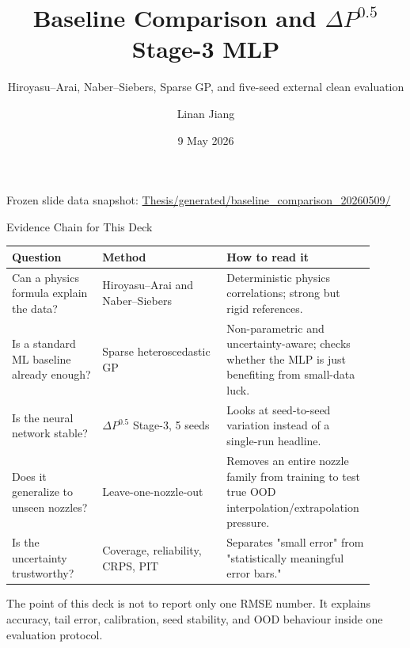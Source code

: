 \documentclass[aspectratio=169,11pt]{beamer}
\title[Baseline Comparison]{Baseline Comparison and \texorpdfstring{\(\Delta P^{0.5}\)}{Delta P exponent 0.5} Stage-3 MLP}
\subtitle{Hiroyasu--Arai, Naber--Siebers, Sparse GP, and five-seed external clean evaluation}
\author{Linan Jiang}
\institute{Aalto University}
\date{9 May 2026}
\begin{document}
\begin{frame}
  \titlepage
  \vspace{-0.8em}
  \centering
  \tiny Frozen slide data snapshot:
  \url{Thesis/generated/baseline_comparison_20260509/}
\end{frame}

\begin{frame}{Evidence Chain for This Deck}
\small
\begin{tabular}{L{0.24\linewidth}L{0.33\linewidth}L{0.34\linewidth}}
\toprule
Question & Method & How to read it \\
\midrule
Can a physics formula explain the data? &
Hiroyasu--Arai and Naber--Siebers &
Deterministic physics correlations; strong but rigid references. \\
Is a standard ML baseline already enough? &
Sparse heteroscedastic GP &
Non-parametric and uncertainty-aware; checks whether the MLP is just benefiting from small-data luck. \\
Is the neural network stable? &
\(\Delta P^{0.5}\) Stage-3, 5 seeds &
Looks at seed-to-seed variation instead of a single-run headline. \\
Does it generalize to unseen nozzles? &
Leave-one-nozzle-out &
Removes an entire nozzle family from training to test true OOD interpolation/extrapolation pressure. \\
Is the uncertainty trustworthy? &
Coverage, reliability, CRPS, PIT &
Separates "small error" from "statistically meaningful error bars." \\
\bottomrule
\end{tabular}

\vspace{0.5em}
\footnotesize
The point of this deck is not to report only one RMSE number. It explains accuracy, tail error, calibration,
seed stability, and OOD behaviour inside one evaluation protocol.
\end{frame}
\end{document}
